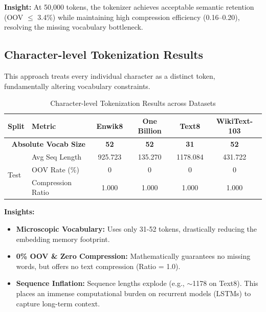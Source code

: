 \textbf{Insight:} At 50,000 tokens, the tokenizer achieves acceptable semantic retention (OOV $\le$ 3.4\%) while maintaining high compression efficiency (0.16–0.20), resolving the missing vocabulary bottleneck.

\subsection{Character-level Tokenization Results}
This approach treats every individual character as a distinct token, fundamentally altering vocabulary constraints.

\begin{table}[H]
\centering
\caption{Character-level Tokenization Results across Datasets}
\renewcommand{\arraystretch}{1.1}
\begin{tabular}{|l|l|c|c|c|c|}
\hline
\textbf{Split} & \textbf{Metric} & \textbf{Enwik8} & \textbf{One Billion} & \textbf{Text8} & \textbf{WikiText-103} \\ \hline
\multicolumn{2}{|c|}{\textbf{Absolute Vocab Size}} & \textbf{52} & \textbf{52} & \textbf{31} & \textbf{52} \\ \hline\hline
\multirow{3}{*}{Test}  
 & Avg Seq Length & 925.723 & 135.270 & 1178.084 & 431.722 \\ \cline{2-6}
 & OOV Rate (\%) & 0 & 0 & 0 & 0 \\ \cline{2-6}
 & Compression Ratio & 1.000 & 1.000 & 1.000 & 1.000 \\ \hline
\end{tabular}
\end{table}

\textbf{Insights:}
\begin{itemize}
    \item \textbf{Microscopic Vocabulary:} Uses only 31-52 tokens, drastically reducing the embedding memory footprint.
    \item \textbf{0\% OOV \& Zero Compression:} Mathematically guarantees no missing words, but offers no text compression (Ratio = 1.0).
    \item \textbf{Sequence Inflation:} Sequence lengths explode (e.g., $\sim$1178 on Text8). This places an immense computational burden on recurrent models (LSTMs) to capture long-term context.
\end{itemize}


